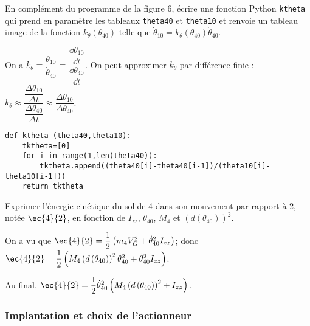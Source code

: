 \documentclass[11pt]{article}
\begin{document}
\UPSTIquestion  En complément du programme de la figure 6, écrire une fonction Python \texttt{ktheta} qui prend en
paramètre les tableaux \texttt{theta40} et \texttt{theta10} et renvoie un tableau image de la fonction $k_{\theta}\left(\theta_{40}\right)$ telle que $\dot{\theta}_{10}=k_{\theta}\left( \theta_{40}\right)\dot{\theta}_{40}$.

\begin{UPSTIcorrige}

On a $
k_{\theta}=\dfrac{\dot{\theta}_{10}}{\dot{\theta}_{40}}=\dfrac{\dfrac{\dd \theta_{10}}{\dd t}}{\dfrac{\dd \theta_{40}}{\dd t}}
$.
On peut approximer $k_{\theta}$ par différence finie :
$
k_{\theta}\approx \dfrac{\dfrac{\Delta \theta_{10}}{\Delta t}}{\dfrac{\Delta \theta_{40}}{\Delta t}}\approx \dfrac{\Delta \theta_{10}}{\Delta \theta_{40}}
$.

\begin{lstlisting}
def ktheta (theta40,theta10):
    tktheta=[0]
    for i in range(1,len(theta40)):
        tktheta.append((theta40[i]-theta40[i-1])/(theta10[i]-theta10[i-1]))
    return tktheta 
\end{lstlisting}

\end{UPSTIcorrige}



\UPSTIquestion  Exprimer l'énergie cinétique du solide 4 dans son mouvement par rapport à 2, notée $\ec{4}{2}$, en fonction de $I_{zz}$, $\dot{\theta}_{40}$, $M_4$ et $\left(d\left(\theta_{40}\right)\right)^2$.

\begin{UPSTIcorrige}
On a vu que $ \ec{4}{2} = \dfrac{1}{2} \left(m_4 V_G^2 +\dot{\theta}_{40}^2  I_{zz} \right)$; donc 
$ \ec{4}{2} = \dfrac{1}{2} \left(M_4   \left(d\left( \theta_{40}\right) \right)^2 \dot{\theta}^2_{40} +\dot{\theta}_{40}^2  I_{zz} \right)$.

Au final, $ \ec{4}{2} = \dfrac{1}{2}  \dot{\theta}_{40}^2 \left(M_4   \left(d\left( \theta_{40}\right) \right)^2 +  I_{zz} \right)$.
\end{UPSTIcorrige}


\subsubsection{Implantation et choix de l’actionneur}

\end{document}
